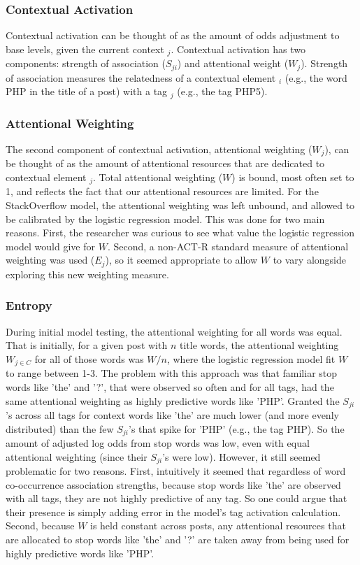 \documentclass[10pt,letterpaper]{article}
\begin{document}
\subsubsection{Contextual Activation}

Contextual activation can be thought of as the amount of odds adjustment to base levels, given the current context $_{j}$.
Contextual activation has two components: strength of association ($S_{ji}$) and attentional weight ($W_{j}$).
Strength of association measures the relatedness of a contextual element $_{i}$ (e.g., the word PHP in the title of a post) with a tag $_{j}$ (e.g., the tag PHP5).

\subsubsection{Attentional Weighting}

The second component of contextual activation, attentional weighting ($W_{j}$), can be thought of as the amount of attentional resources that are dedicated to contextual element $_{j}$.
Total attentional weighting ($W$) is bound, most often set to 1, and reflects the fact that our attentional resources are limited.
For the StackOverflow model, the attentional weighting was left unbound, and allowed to be calibrated by the logistic regression model.
This was done for two main reasons.
First, the researcher was curious to see what value the logistic regression model would give for $W$.
Second, a non-ACT-R standard measure of attentional weighting was used ($E_{j}$), so it seemed appropriate to allow $W$ to vary alongside exploring this new weighting measure. 

\subsubsection{Entropy}

During initial model testing, the attentional weighting for all words was equal.
That is initially, for a given post with $n$ title words, the attentional weighting $W_{j\in C}$ for all of those words was $W/n$, where the logistic regression model fit $W$ to range between 1-3.
The problem with this approach was that familiar stop words like 'the' and '?', that were observed so often and for all tags, had the same attentional weighting as highly predictive words like 'PHP'.
Granted the $S_{ji}$'s across all tags for context words like 'the' are much lower (and more evenly distributed) than the few $S_{ji}$'s that spike for 'PHP' (e.g., the tag PHP).
So the amount of adjusted log odds from stop words was low, even with equal attentional weighting (since their $S_{ji}$'s were low).
However, it still seemed problematic for two reasons.
First, intuitively it seemed that regardless of word co-occurrence association strengths, because stop words like 'the' are observed with all tags, they are not highly predictive of any tag.
So one could argue that their presence is simply adding error in the model's tag activation calculation.
Second, because $W$ is held constant across posts, any attentional resources that are allocated to stop words like 'the' and '?' are taken away from being used for highly predictive words like 'PHP'.
\end{document}
